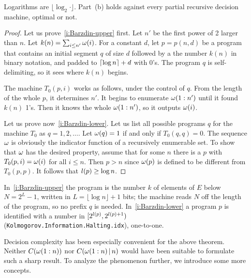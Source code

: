 \begin{formalization}
Logarithms are \( \lfloor \log_{2} \cdot \rfloor \). Part~(b) holds against every partial
recursive decision machine, optimal or not.
\end{formalization}

 \begin{proof}
  \leanok
Let us prove~\eqref{i:Barzdin-upper} first.
Let \( n' \) be the first power of 2 larger than \( n \).
Let \( k(n) = \sum_{i \le n'} \omega(i) \).
For a constant \( d \), let \( p = p(n, d) \) be a program
that contains an initial segment \( q \) of size \( d \) followed by a
the number \( k(n) \) in binary notation, and padded to \( {\lceil \log n\rceil} + d \) 
with 0's.
The program \( q \) is self-delimiting, so it sees where \( k(n) \) begins.

The machine \( T_{0}(p, i) \) works as follows, under the control of \( q \).
From the length of the whole \( p \), it determines \( n' \).
It begins to enumerate \( \omega(1:n') \) until it found \( k(n) \) 1's.
Then it knows the whole \( \omega(1:n') \), so it outputs \( \omega(i) \).

Let us prove now~\eqref{i:Barzdin-lower}.
Let us list all possible programs \( q \) for the machine \( T_{0} \) as 
\( q = 1, 2, \dotsc \).
Let \( \omega(q) = 1 \) if and only if \( T_{0}(q, q) = 0 \).
The sequence \( \omega \) is obviously the indicator function of a recursively
enumerable set.
To show that \( \omega \) has the desired property, assume that for some
\( n \) there is a \( p \) with \( T_{0}(p, i) = \omega(i) \) for all \( i \le n \).
Then \( p > n \) since \( \omega(p) \) is defined to be different from \( T_{0}(p, p) \).
It follows that \( l(p) \ge \log n \).
 \end{proof}

\begin{formalization}
In~\eqref{i:Barzdin-upper} the program is the number \( k \) of elements of \( E \) below
\( N = 2^{L} - 1 \), written in \( L = \lfloor \log n \rfloor + 1 \) bits; the machine reads
\( N \) off the length of the program, so no prefix \( q \) is needed. In~\eqref{i:Barzdin-lower}
a program \( p \) is identified with a number in \( [2^{l(p)}, 2^{l(p)+1}) \)
(\texttt{Kolmogorov.Information.Halting.idx}), one-to-one.
\end{formalization}

Decision complexity has been especially convenient for the above theorem.
Neither \( C(\omega(1:n)) \) nor \( C(\omega(1:n) \,\vert\, n) \) would have been suitable to
formulate such a sharp result.
To analyze the phenomenon further, we introduce some more concepts.

